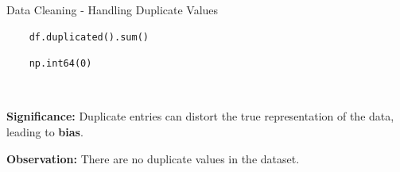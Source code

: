 \documentclass[14pt, aspectratio=169]{beamer}
\begin{document}
\begin{frame}[containsverbatim]{Data Cleaning - Handling Duplicate Values}
  \begin{verbatim}
    df.duplicated().sum()
  \end{verbatim}
  \vspace{1em}
  \begin{verbatim}
    np.int64(0)
  \end{verbatim}
  $ $\\
  \begin{minipage}{0.8\textwidth}
    \begin{block}{}
      \textbf{Significance:} \small
      Duplicate entries can distort the true representation of the data, leading to \textbf{bias}.
    \end{block}
    \begin{block}{}
      \textbf{Observation:} \small
      There are no duplicate values in the dataset.
    \end{block}
  \end{minipage}
\end{frame}
\end{document}
